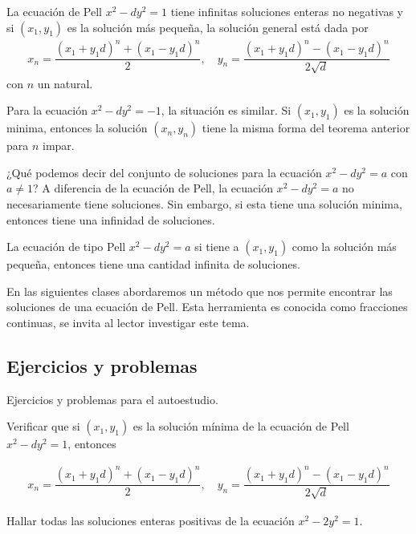 \begin{theorem.box}{}{}
    La ecuación de Pell $x^2 - dy^2 = 1$ tiene infinitas soluciones enteras no negativas y si $(x_1, y_1)$ es la solución más pequeña,
    la solución general está dada por
    \begin{align*}
        x_n = \dfrac{(x_1 + y_1 d)^n + (x_1 - y_1 d)^n}{2}, \quad
        y_n = \dfrac{(x_1 + y_1 d)^n - (x_1 - y_1 d)^n}{2\sqrt{d}}
    \end{align*}
    con $n$ un natural.
\end{theorem.box}

Para la ecuación $x^2 - dy^2 = -1$, la situación es similar.
Si $(x_1, y_1)$ es la solución minima, entonces la solución $(x_n, y_n)$ tiene la misma forma del teorema anterior para $n$ impar.

¿Qué podemos decir del conjunto de soluciones para la ecuación $x^2 - dy^2 = a$ con $a \neq 1$?
A diferencia de la ecuación de Pell, la ecuación $x^2 - dy^2 = a$ no necesariamente tiene soluciones.
Sin embargo, si esta tiene una solución minima, entonces tiene una infinidad de soluciones.

\begin{theorem.box}{}{}
    La ecuación de tipo Pell $x^2 - dy^2 = a$ si tiene a $(x_1, y_1)$ como la solución más pequeña,
    entonces tiene una cantidad infinita de soluciones.
\end{theorem.box}

En las siguientes clases abordaremos un método que nos permite encontrar las soluciones de una ecuación de Pell.
Esta herramienta es conocida como fracciones continuas, se invita al lector investigar este tema.

\subsection{Ejercicios y problemas}
Ejercicios y problemas para el autoestudio.

\begin{exercise}
    Verificar que si $(x_1, y_1)$ es la solución mínima de la ecuación de Pell $x^2 - dy^2 = 1$, entonces

    \begin{align*}
        x_n = \dfrac{(x_1 + y_1 d)^n + (x_1 - y_1 d)^n}{2}, \quad
        y_n = \dfrac{(x_1 + y_1 d)^n - (x_1 - y_1 d)^n}{2\sqrt{d}}
    \end{align*}
\end{exercise}

\begin{exercise}
    Hallar todas las soluciones enteras positivas de la ecuación $x^2 - 2y^2 = 1$.
\end{exercise}

